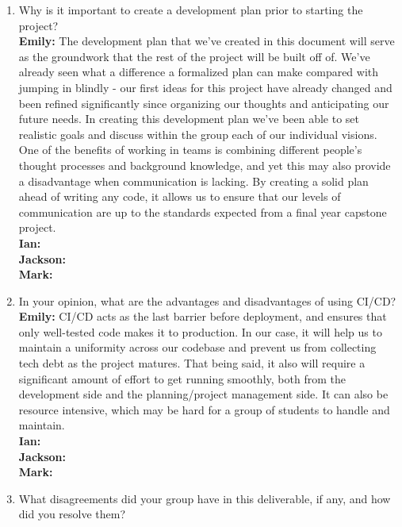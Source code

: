 \documentclass{article}
\begin{document}
\begin{enumerate}
    \item Why is it important to create a development plan prior to starting the
    project?\\
    \textbf{Emily:} The development plan that we’ve created in this document will serve as the groundwork that the rest of the project will be built off of. 
                    We’ve already seen what a difference a formalized plan can make compared with jumping in blindly - our first ideas for this project have 
                    already changed and been refined significantly since organizing our thoughts and anticipating our future needs. In creating this development 
                    plan we’ve been able to set realistic goals and discuss within the group each of our individual visions. One of the benefits of working in 
                    teams is combining different people’s thought processes and background knowledge, and yet this may also provide a disadvantage when communication 
                    is lacking. By creating a solid plan ahead of writing any code, it allows us to ensure that our levels of communication are up to the standards 
                    expected from a final year capstone project. \\
    \textbf{Ian:} \\
    \textbf{Jackson:} \\
    \textbf{Mark:} \\

    \item In your opinion, what are the advantages and disadvantages of using
    CI/CD?\\
    \textbf{Emily:} CI/CD acts as the last barrier before deployment, and ensures that only well-tested code makes it to production. In our case, it will help 
                    us to maintain a uniformity across our codebase and prevent us from collecting tech debt as the project matures. That being said, it also will 
                    require a significant amount of effort to get running smoothly, both from the development side and the planning/project management side. It 
                    can also be resource intensive, which may be hard for a group of students to handle and maintain.  \\
    \textbf{Ian:} \\
    \textbf{Jackson:} \\
    \textbf{Mark:} \\
    
    \item What disagreements did your group have in this deliverable, if any,
    and how did you resolve them?
\end{enumerate}
\end{document}
